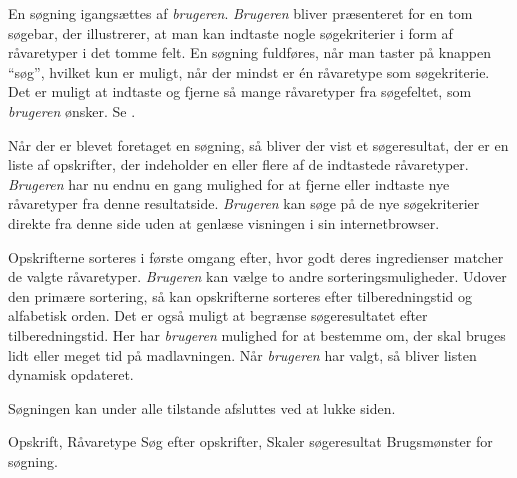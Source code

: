 {En søgning igangsættes af \textit{brugeren}. \textit{Brugeren} bliver præsenteret for en tom søgebar, der illustrerer, at man kan indtaste nogle søgekriterier i form af råvaretyper i det tomme felt. En søgning fuldføres, når man taster på knappen ``søg'', hvilket kun er muligt, når der mindst er én råvaretype som søgekriterie. Det er muligt at indtaste og fjerne så mange råvaretyper fra søgefeltet, som \textit{brugeren} ønsker. Se .

Når der er blevet foretaget en søgning, så bliver der vist et søgeresultat, der er en liste af opskrifter, der indeholder en eller flere af de indtastede råvaretyper. \textit{Brugeren} har nu endnu en gang mulighed for at fjerne eller indtaste nye råvaretyper fra denne resultatside. \textit{Brugeren} kan søge på de nye søgekriterier direkte fra denne side uden at genlæse visningen i sin internetbrowser.

Opskrifterne sorteres i første omgang efter, hvor godt deres ingredienser matcher de valgte råvaretyper. \textit{Brugeren} kan vælge to andre sorteringsmuligheder. Udover den primære sortering, så kan opskrifterne sorteres efter tilberedningstid og alfabetisk orden. Det er også muligt at begrænse søgeresultatet efter tilberedningstid. Her har \textit{brugeren} mulighed for at bestemme om, der skal bruges lidt eller meget tid på madlavningen. Når \textit{brugeren} har valgt, så bliver listen dynamisk opdateret.

Søgningen kan under alle tilstande afsluttes ved at lukke siden.}
{Opskrift, Råvaretype}
{Søg efter opskrifter, Skaler søgeresultat}
{Brugsmønster for søgning.}
